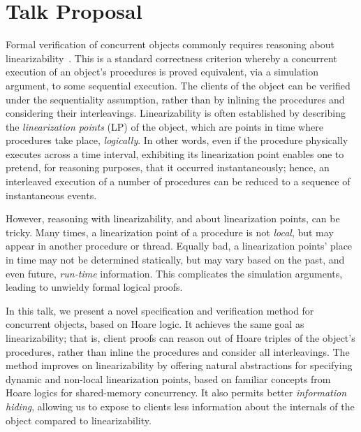 \section{Talk Proposal}
\label{sc:intro} 
   
Formal verification of concurrent objects commonly requires reasoning
about linearizability~\cite{Herlihy-Wing:TOPLAS90}. This is a standard
correctness criterion whereby a concurrent execution of an object's
procedures is proved equivalent, via a simulation argument, to some
sequential execution. The clients of the object can be verified under
the sequentiality assumption, rather than by inlining the procedures
and considering their interleavings. Linearizability is often
established by describing the \emph{linearization points} (LP) of the
object, which are points in time where procedures take place,
\emph{logically}.  In other words, even if the procedure physically
executes across a time interval, exhibiting its linearization point
enables one to pretend, for reasoning purposes, that it occurred
instantaneously; hence, an interleaved execution of a number of
procedures can be reduced to a sequence of instantaneous events.


However, reasoning with linearizability, and about linearization
points, can be tricky. Many times, a linearization point of a
procedure is not \emph{local}, but may appear in another procedure or
thread. Equally bad, a linearization points' place in time may not be
determined statically, but may vary based on the past, and even
future, \emph{run-time} information. This complicates the simulation
arguments, leading to unwieldy formal logical proofs.


In this talk, we present a novel specification and verification method
for concurrent objects, based on Hoare logic. It achieves the same
goal as linearizability; that is, client proofs can reason out of
Hoare triples of the object's procedures, rather than inline the
procedures and consider all interleavings. The method improves on
linearizability by offering natural abstractions for specifying
dynamic and non-local linearization points, based on familiar concepts
from Hoare logics for shared-memory concurrency. It also permits
better \emph{information hiding}, allowing us to expose to clients
less information about the internals of the object compared to
linearizability.

